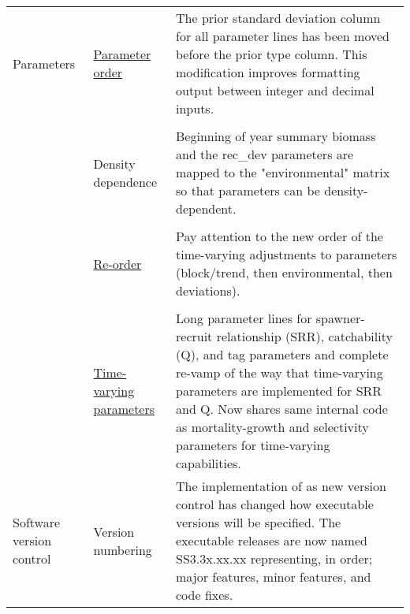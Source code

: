 \begin{center}
\begin{longtable}{p{2cm} p{3cm} p{10cm}}
				\hline
				Parameters 
					& \hyperlink{paraOrder}{Parameter order} & The prior standard deviation column for all parameter lines has been moved before the prior type column.  This modification improves formatting output between integer and decimal inputs.\\ 
				 \\
					& Density dependence & 
						Beginning of year summary biomass and the rec\_dev parameters are mapped to the "environmental" matrix so that parameters can be density-dependent.\\
				  \\						
					& \hyperlink{tvOrder}{Re-order} & 
						Pay attention to the new order of the time-varying adjustments to parameters (block/trend, then environmental, then deviations). \\
				  \\						
					& \hyperlink{time-vary}{Time-varying parameters} & 
						Long parameter lines for spawner-recruit relationship (SRR), catchability (Q), and tag parameters and complete re-vamp of the way that time-varying parameters are implemented for SRR and Q.  Now shares same internal code as mortality-growth and selectivity parameters for time-varying capabilities.\\
				 \hline
				 Software version control
					 & Version numbering	& The implementation of as new version control has changed how executable versions will be specified.  The executable releases are now named SS3.3x.xx.xx representing, in order; major features, minor features, and code fixes. \\
				 
				\hline	
			\end{longtable}
		\end{center}
		
